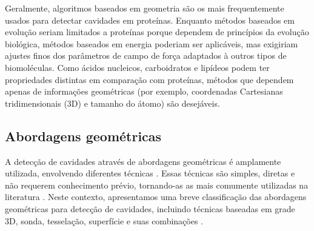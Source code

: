 \documentclass[Portugues]{phdquali}
\begin{document}
Geralmente, algoritmos baseados em geometria são os mais frequentemente usados para detectar cavidades em proteínas. Enquanto métodos baseados em evolução seriam limitados a proteínas porque dependem de princípios da evolução biológica, métodos baseados em energia poderiam ser aplicáveis, mas exigiriam ajustes finos dos parâmetros de campo de força adaptados à outros tipos de biomoléculas. Como ácidos nucleicos, carboidratos e lipídeos podem ter propriedades distintas em comparação com proteínas, métodos que dependem apenas de informações geométricas (por exemplo, coordenadas Cartesianas tridimensionais (3D) e tamanho do átomo) são desejáveis.

\subsection{Abordagens geométricas \label{sec:geometric-approaches}}

A detecção de cavidades através de abordagens geométricas é amplamente utilizada, envolvendo diferentes técnicas \cite{simoes2017,guerra2020,krone2016}. Essas técnicas são simples, diretas e não requerem conhecimento prévio, tornando-as as mais comumente utilizadas na literatura \cite{henrich2010,oliveira2014}. Neste contexto, apresentamos uma breve classificação das abordagens geométricas para detecção de cavidades, incluindo técnicas baseadas em grade 3D, sonda, tesselação, superfície e suas combinações \cite{simoes2017,guerra2020,krone2016,guerra2023B}.
\end{document}
